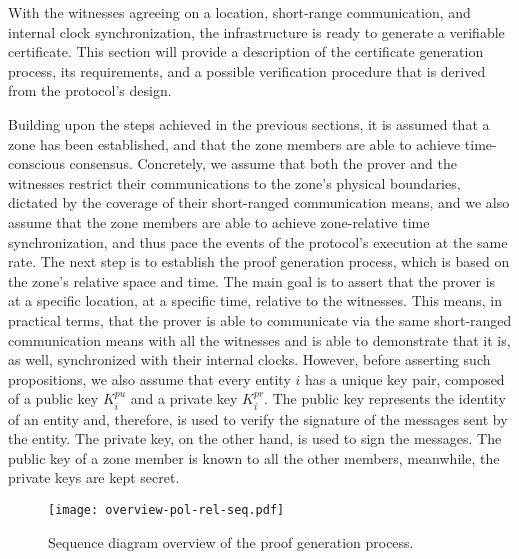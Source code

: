 With the witnesses agreeing on a location, short-range communication, and internal clock synchronization, the infrastructure is ready to generate a verifiable \pol{} certificate. This section will provide a description of the certificate generation process, its requirements, and a possible verification procedure that is derived from the protocol's design. 


Building upon the steps achieved in the previous sections, it is assumed that a zone has been established, and that the zone members are able to achieve time-conscious consensus. Concretely, we assume that both the prover and the witnesses restrict their communications to the zone's physical boundaries, dictated by the coverage of their short-ranged communication means, and we also assume that the zone members are able to achieve zone-relative time synchronization, and thus pace the events of the protocol's execution at the same rate. The next step is to establish the proof generation process, which is based on the zone's relative space and time. The main goal is to assert that the prover is at a specific location, at a specific time, relative to the witnesses. This means, in practical terms, that the prover is able to communicate via the same short-ranged communication means with all the witnesses and is able to demonstrate that it is, as well, synchronized with their internal clocks. However, before asserting such propositions, we also assume that every entity $i$ has a unique key pair, composed of a public key $K^{pu}_i$ and a private key $K^{pr}_i$. The public key represents the identity of an entity and, therefore, is used to verify the signature of the messages sent by the entity. The private key, on the other hand, is used to sign the messages. The public key of a zone member is known to all the other members, meanwhile, the private keys are kept secret. 

\begin{figure}[hb!]
    \begin{center}
    \texttt{[image: overview-pol-rel-seq.pdf]}
    \caption{Sequence diagram overview of the proof generation process.}
    \label{fig:proof-of-location-overview-relative-pol-seq}
    \end{center}
\end{figure}

